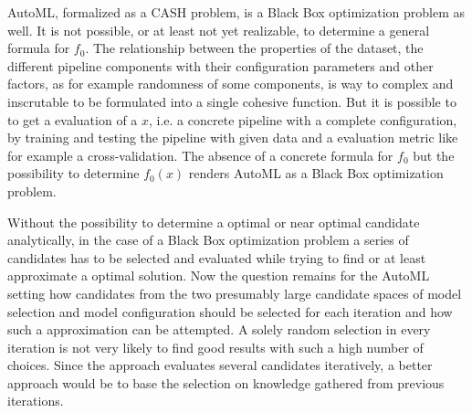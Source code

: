 AutoML, formalized as a CASH problem, is a Black Box optimization problem as well.
It is not possible, or at least not yet realizable, to determine a general formula for $f_0$.
The relationship between the properties of the dataset, the different pipeline components with their configuration parameters and other factors, as for example randomness of some components, is way to complex and inscrutable to be formulated into a single cohesive function.
But it is possible to to get a evaluation of a $x$, i.e. a concrete pipeline with a complete configuration, by training and testing the pipeline with given data and a evaluation metric like for example a cross-validation.
The absence of a concrete formula for $f_0$ but the possibility to determine $f_0(x)$ renders AutoML as a Black Box optimization problem.

Without the possibility to determine a optimal or near optimal candidate analytically, in the case of a Black Box optimization problem a series of candidates has to be selected and evaluated while trying to find or at least approximate a optimal solution.
Now the question remains for the AutoML setting how candidates from the two presumably large candidate spaces of model selection and model configuration should be selected for each iteration and how such a approximation can be attempted.\newline
A solely random selection in every iteration is not very likely to find good results with such a high number of choices.
Since the approach evaluates several candidates iteratively, a better approach would be to base the selection on knowledge gathered from previous iterations.

